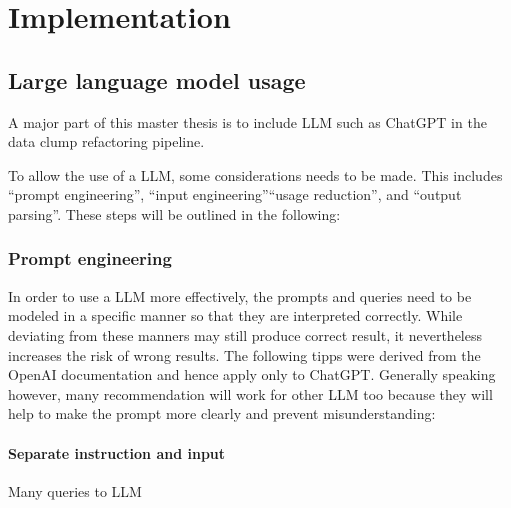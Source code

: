 
\begingroup
\renewcommand{\cleardoublepage}{} %
\renewcommand{\clearpage}{}
\chapter{Implementation}\label{chapter:implementation}
\endgroup

\section{Large language model usage}
A major part of this master thesis is to include \ac{LLM} such as ChatGPT in the data clump refactoring pipeline. 

To allow the use of a \ac{LLM}, some considerations needs to be made. This includes \enquote{prompt engineering}, \enquote{input engineering}\enquote{usage reduction}, and   \enquote{output parsing}. These steps will be outlined in the following:

\subsection{Prompt engineering}


In order to use a \ac{LLM} more effectively, the prompts and queries need to be modeled in a specific manner so that they are interpreted correctly. While deviating from these manners may still produce correct result, it nevertheless increases the risk of wrong results. The following tipps were derived from the OpenAI documentation \cite{ChatGPT_url} and hence apply only to ChatGPT. Generally speaking however, many recommendation will work for other \ac{LLM} too because they will help to make the prompt more clearly and prevent misunderstanding:

\subsubsection{Separate instruction and input}
Many queries to \ac{LLM}

